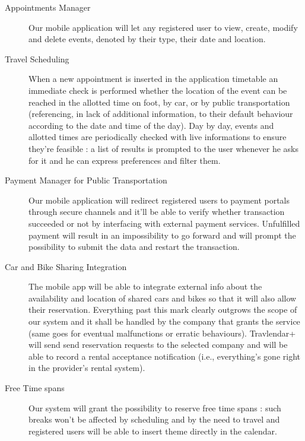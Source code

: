 		\begin{description}
			\item[Appointments Manager] 
			Our mobile application will let any registered user to view, create, modify and delete events, denoted by their type, their date and location.

			\item[Travel Scheduling] 
			When a new appointment is inserted in the application timetable an immediate check is performed whether the location of the event can be reached in the allotted time on foot, by car, or by public transportation (referencing, in lack of additional information, to their default behaviour according to the date and time of the day).
			Day by day, events and allotted times are periodically checked with live informations to ensure they’re feasible : a list of results is prompted to the user whenever he asks for it and he can express preferences and filter them.
			
			\item[Payment Manager for Public Transportation]
			Our mobile application will redirect registered users to payment portals through secure channels and it’ll be able to verify whether transaction succeeded or not by interfacing with external payment services.
			Unfulfilled payment will result in an impossibility to go forward and will prompt the possibility to submit the data and restart the transaction.

			\item[Car and Bike Sharing Integration]
			The mobile app will be able to integrate external info about the availability and location of shared cars and bikes so that it will also allow their reservation.
			Everything past this mark clearly outgrows the scope of our system and it shall be handled by the company that grants the service (same goes for eventual malfunctions or erratic behaviours). 
			Travlendar+ will send send reservation requests to the selected company and will be able to record a rental acceptance notification (i.e., everything’s gone right in the provider’s rental system).


			\item[Free Time spans]
			Our system will grant the possibility to reserve free time spans :
			such breaks won’t be affected by scheduling and by the need to travel and registered users will be able to insert theme directly in the calendar.

	\end{description}

